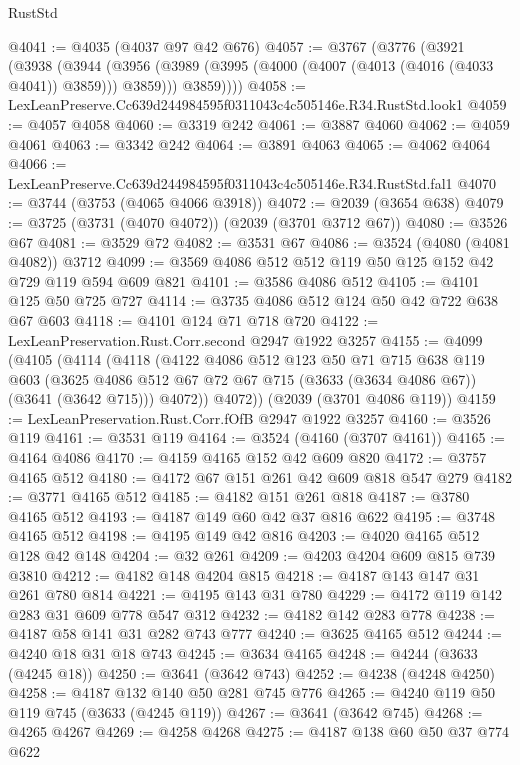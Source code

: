 \begin{lexlean}{RustStd}
\begin{coremodule}
@4041 := @4035 (@4037 @97 @42 @676)
@4057 := @3767
    (@3776
      (@3921
        (@3938
          (@3944
            (@3956 (@3989 (@3995 (@4000 (@4007 (@4013 (@4016 (@4033 @4041)) @3859))) @3859)))
            @3859))))
@4058 := LexLeanPreserve.Cc639d244984595f0311043c4c505146e.R34.RustStd.look1
@4059 := @4057 @4058
@4060 := @3319 @242
@4061 := @3887 @4060
@4062 := @4059 @4061
@4063 := @3342 @242
@4064 := @3891 @4063
@4065 := @4062 @4064
@4066 := LexLeanPreserve.Cc639d244984595f0311043c4c505146e.R34.RustStd.fal1
@4070 := @3744 (@3753 (@4065 @4066 @3918))
@4072 := @2039 (@3654 @638)
@4079 := @3725 (@3731 (@4070 @4072)) (@2039 (@3701 @3712 @67))
@4080 := @3526 @67
@4081 := @3529 @72
@4082 := @3531 @67
@4086 := @3524 (@4080 (@4081 @4082)) @3712
@4099 := @3569 @4086 @512 @512 @119 @50 @125 @152 @42 @729 @119 @594 @609 @821
@4101 := @3586 @4086 @512
@4105 := @4101 @125 @50 @725 @727
@4114 := @3735 @4086 @512 @124 @50 @42 @722 @638 @67 @603
@4118 := @4101 @124 @71 @718 @720
@4122 := LexLeanPreservation.Rust.Corr.second @2947 @1922 @3257
@4155 := @4099
    (@4105
      (@4114
        (@4118
          (@4122
            @4086
            @512
            @123
            @50
            @71
            @715
            @638
            @119
            @603
            (@3625 @4086 @512 @67 @72 @67 @715 (@3633 (@3634 @4086 @67)) (@3641 (@3642 @715)))
            @4072))
        @4072))
    (@2039 (@3701 @4086 @119))
@4159 := LexLeanPreservation.Rust.Corr.fOfB @2947 @1922 @3257
@4160 := @3526 @119
@4161 := @3531 @119
@4164 := @3524 (@4160 (@3707 @4161))
@4165 := @4164 @4086
@4170 := @4159 @4165 @152 @42 @609 @820
@4172 := @3757 @4165 @512
@4180 := @4172 @67 @151 @261 @42 @609 @818 @547 @279
@4182 := @3771 @4165 @512
@4185 := @4182 @151 @261 @818
@4187 := @3780 @4165 @512
@4193 := @4187 @149 @60 @42 @37 @816 @622
@4195 := @3748 @4165 @512
@4198 := @4195 @149 @42 @816
@4203 := @4020 @4165 @512 @128 @42 @148
@4204 := @32 @261
@4209 := @4203 @4204 @609 @815 @739 @3810
@4212 := @4182 @148 @4204 @815
@4218 := @4187 @143 @147 @31 @261 @780 @814
@4221 := @4195 @143 @31 @780
@4229 := @4172 @119 @142 @283 @31 @609 @778 @547 @312
@4232 := @4182 @142 @283 @778
@4238 := @4187 @58 @141 @31 @282 @743 @777
@4240 := @3625 @4165 @512
@4244 := @4240 @18 @31 @18 @743
@4245 := @3634 @4165
@4248 := @4244 (@3633 (@4245 @18))
@4250 := @3641 (@3642 @743)
@4252 := @4238 (@4248 @4250)
@4258 := @4187 @132 @140 @50 @281 @745 @776
@4265 := @4240 @119 @50 @119 @745 (@3633 (@4245 @119))
@4267 := @3641 (@3642 @745)
@4268 := @4265 @4267
@4269 := @4258 @4268
@4275 := @4187 @138 @60 @50 @37 @774 @622

\end{coremodule}
\end{lexlean}
